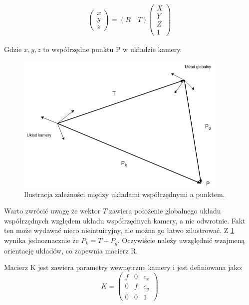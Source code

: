 \documentclass{article}
\begin{document}
\begin{align*}
	\left( \begin{array}{l} x \\ y \\ z \end{array} \right) =
	(R \quad T)
	\left( \begin{array}{l}
		X \\	Y \\	Z \\	1
	\end{array} \right) 
\end{align*}

Gdzie $x, y, z$ to współrzędne punktu P w układzie kamery.


\begin{figure}
\centering
	\includegraphics[width=0.90\textwidth]{pinhole.jpg}\par\vspace{1cm}
\caption{Ilustracja zależności między układami współrzędnymi a punktem.}
	\label{fig:camera_coordinate_systems}
\end{figure}

Warto zwrócić uwagę że wektor $T$ zawiera położenie globalnego układu współrzędnych względem układu współrzędnych kamery, a nie odwrotnie. Fakt ten może wydawać nieco nieintuicyjny, ale można go łatwo zilustrować. Z \ref{fig:camera_coordinate_systems} wynika jednoznacznie że $P_k = T + P_g$. Oczywiście należy uwzględnić wzajmeną orientację układów, co zapewnia macierz R.

Macierz K jest zawiera parametry wewnętrzne kamery i jest definiowana jako:
\begin{equation}
	K = \left( \begin{array}{lll}
		f & 0 & c_x \\
		0 & f & c_y \\
		0 & 0 & 1
	\end{array} \right)
\end{equation}
\end{document}

